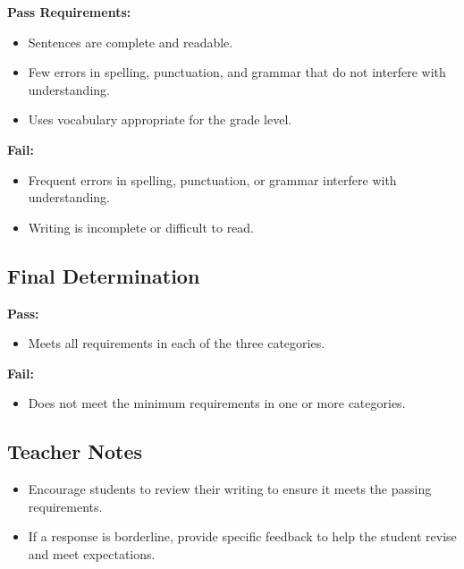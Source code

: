 \documentclass[12pt]{article}
\begin{document}
\begin{tcolorbox}[colframe=black!60, colback=white, title=Language and Conventions]
\textbf{Pass Requirements:}
\begin{itemize}
    \item Sentences are complete and readable.
    \item Few errors in spelling, punctuation, and grammar that do not interfere with understanding.
    \item Uses vocabulary appropriate for the grade level.
\end{itemize}

\textbf{Fail:}
\begin{itemize}
    \item Frequent errors in spelling, punctuation, or grammar interfere with understanding.
    \item Writing is incomplete or difficult to read.
\end{itemize}
\end{tcolorbox}

\subsection*{Final Determination}

\begin{tcolorbox}[colframe=black!60, colback=white, title=How to Determine Pass/Fail]
\textbf{Pass:}
\begin{itemize}
    \item Meets all requirements in each of the three categories.
\end{itemize}

\textbf{Fail:}
\begin{itemize}
    \item Does not meet the minimum requirements in one or more categories.
\end{itemize}
\end{tcolorbox}

\subsection*{Teacher Notes}
\begin{itemize}
    \item Encourage students to review their writing to ensure it meets the passing requirements.
    \item If a response is borderline, provide specific feedback to help the student revise and meet expectations.
\end{itemize}
\end{document}
